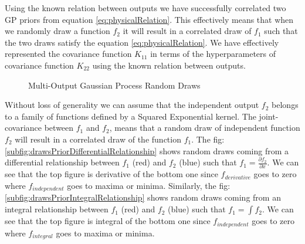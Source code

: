    Using the known relation between outputs we have successfully correlated two GP priors from equation \ref{eq:physicalRelation}. This effectively means that when we randomly draw a function \(f_{2}\) it will result in a correlated draw of \(f_{1}\) such that the two draws satisfy the equation \ref{eq:physicalRelation}. We have effectively represented the covariance function \(K_{11}\) in terms of the hyperparameters of covariance function \(K_{22}\) using the known relation between outputs.

\begin{figure}[!t]
  \centering
  \quad
  \caption{Multi-Output Gaussian Process Random Draws}
\end{figure}

Without loss of generality we can assume that the independent output \(f_{2}\) belongs to a family of functions defined by a Squared Exponential kernel. The joint-covariance between \(f_{1}\) and \(f_{2}\), means that a random draw of independent function \(f_{2}\) will result in a correlated draw of the function \(f_{1}\). The fig: \ref{subfig:drawsPriorDifferentialRelationship} shows random draws coming from a differential relationship between \(f_{1}\) (red) and \(f_{2}\) (blue) such that \(f_{1} = \frac{\partial f_{2}}{\partial x}\). We can see that the top figure is derivative of the bottom one since \(f_{derivative}\) goes to zero where \(f_{independent}\) goes to maxima or minima. Similarly, the fig: \ref{subfig:drawsPriorIntegralRelationship} shows random draws coming from an integral relationship between \(f_{1}\) (red) and \(f_{2}\) (blue) such that \(f_{1} = \int f_{2}\). We can see that the top figure is integral of the bottom one since \(f_{independent}\) goes to zero where \(f_{integral}\) goes to maxima or minima. 

